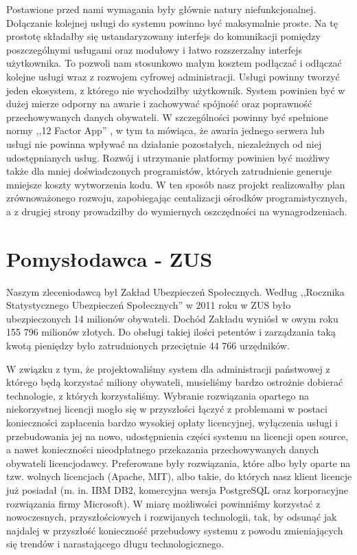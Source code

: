 \documentclass[licencjacka]{pracamgr}
\begin{document}
Postawione przed nami wymagania były głównie natury niefunkcjonalnej. Dołączanie kolejnej usługi do systemu
powinno być maksymalnie proste. Na tę prostotę składałby się ustandaryzowany interfejs do komunikacji pomiędzy
poszczególnymi usługami oraz modułowy i łatwo rozszerzalny interfejs użytkownika.
To pozwoli nam stosunkowo małym kosztem podłączać i odłączać kolejne usługi wraz z
rozwojem cyfrowej administracji. Usługi powinny tworzyć jeden ekosystem, z którego nie wychodziłby użytkownik. System
powinien być w dużej mierze odporny na awarie i zachowywać spójność oraz poprawność przechowywanych danych obywateli.
W szczególności powinny być spełnione normy ,,12 Factor App'' \cite{tfa}, w tym ta mówiąca, że awaria jednego serwera
lub usługi nie powinna wpływać na działanie pozostałych, niezależnych od niej udostępnianych usług.
Rozwój i utrzymanie platformy powinien być możliwy także dla mniej doświadczonych
programistów, których zatrudnienie generuje mniejsze koszty wytworzenia kodu. W ten sposób nasz projekt realizowałby plan
zrównoważonego rozwoju, zapobiegając centalizacji ośrodków programistycznych, a z drugiej strony prowadziłby do wymiernych
oszczędności na wynagrodzeniach.

\section{Pomysłodawca - ZUS}

Naszym zleceniodawcą był Zakład Ubezpieczeń Społecznych. Według ,,Rocznika
Statystycznego Ubezpieczeń Społecznych'' \cite{rocznik} w 2011 roku w ZUS było ubezpieczonych
14 milionów obywateli. Dochód Zakładu wyniósł w owym roku 155 796 milionów
złotych. Do obsługi takiej ilości petentów i zarządzania taką kwotą pieniędzy
było zatrudnionych przeciętnie 44 766 urzędników.

W związku z tym, że projektowaliśmy system dla administracji państwowej z
którego będą korzystać miliony obywateli, musieliśmy bardzo ostrożnie dobierać
technologie, z których korzystaliśmy. Wybranie rozwiązania opartego na
niekorzystnej licencji mogło się w przyszłości łączyć z problemami w postaci
konieczności zapłacenia bardzo wysokiej opłaty licencyjnej, wyłączenia usługi i
przebudowania jej na nowo, udostępnienia części systemu na licencji open source,
a nawet konieczności nieodpłatnego przekazania przechowywanych danych obywateli
licencjodawcy. Preferowane były rozwiązania, które albo były oparte na tzw. wolnych licencjach (Apache, MIT), albo takie, do
których nasz klient licencje już posiadał (m. in. IBM DB2, komercyjna wersja
PostgreSQL oraz korporacyjne rozwiązania firmy Microsoft). W miarę możliwości
powinniśmy korzystać z nowoczesnych, przyszłościowych i rozwijanych technologii,
tak, by odsunąć jak najdalej w przyszłość konieczność przebudowy systemu z
powodu zmieniających się trendów i narastającego długu technologicznego.
\end{document}
